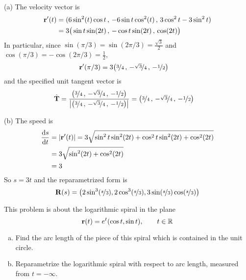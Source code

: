 \begin{solution} (a) The velocity vector is
\begin{align*}
\mathbf{r}'(t) &= (6\sin^2(t)\cos t\,,\, -6\sin t\cos^2(t)\,,\, 3\cos^2t-3\sin^2t) \\
        &= 3\big(\sin t \sin(2t)\,,\,-\cos t\sin(2t)\,,\,\cos(2t)\big)
\end{align*}
In particular, since $\sin(\pi/3)=\sin(2\pi/3)=\frac{\sqrt{3}}{2}$
and $\cos(\pi/3)=-\cos(2\pi/3)=\frac{1}{2}$,
\begin{align*}
\mathbf{r}'(\pi/3)  &= 3\big(\nicefrac{3}{4}\,,\,
                -\nicefrac{\sqrt{3}}{4}\,,\,-\nicefrac{1}{2}\big)
\end{align*}
and the specified unit tangent vector is
\begin{align*}
\hat{\mathbf{T}} &= \frac{\big(\nicefrac{3}{4}\,,\,
                -\nicefrac{\sqrt{3}}{4}\,,\,-\nicefrac{1}{2}\big)}
               {\big|\big(\nicefrac{3}{4}\,,\,
                -\nicefrac{\sqrt{3}}{4}\,,\,-\nicefrac{1}{2}\big)\big|} 
        =\big(\nicefrac{3}{4}\,,\,
                -\nicefrac{\sqrt{3}}{4}\,,\,-\nicefrac{1}{2}\big)
\end{align*}

\noindent (b)
The speed is
\begin{align*}
\diff{s}{t} 
  &= |\vr'(t)| = 3\sqrt{\sin^2t\sin^2(2t)+\cos^2t\sin^2(2t)+\cos^2(2t)} \\
  &= 3\sqrt{\sin^2(2t)+\cos^2(2t)} \\
  &=3
\end{align*}
So $s=3t$ and the reparametrized form is
\begin{align*}
\mathbf{R}(s) = \big(2 \sin^3(\nicefrac{s}{3}) , 2\cos^3(\nicefrac{s}{3}), 
       3 \sin(\nicefrac{s}{3}) \cos(\nicefrac{s}{3})\big)
\end{align*}

\end{solution}



\begin{question}[M317 2008D]\label{prob_s1.2:spiral} %
This problem is about the logarithmic spiral in the plane
\begin{equation*}
\mathbf{r}(t) = e^t (\cos t, \sin t),\qquad t \in \mathbb{R}
\end{equation*}
\begin{enumerate}[(a)]
\item
Find the arc length of the piece of this spiral which is contained in the unit
circle.
\item
Reparametrize the logarithmic spiral with respect to arc length, measured
from $t = -\infty$.
\end{enumerate}
\end{question}

